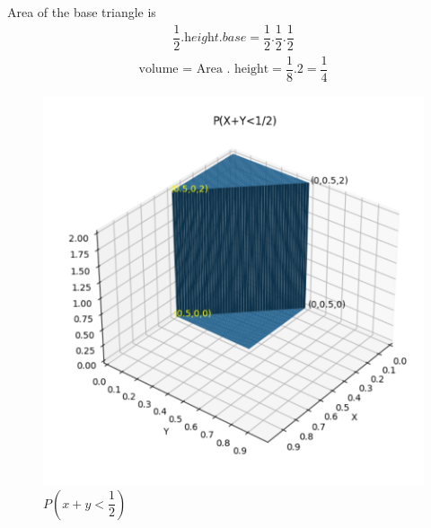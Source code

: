 Area of the base triangle is 
\begin{align}
 \dfrac{1}{2}.\textit{height}.\textit{base} =\dfrac{1}{2}.\dfrac{1}{2}.\dfrac{1}{2}
 \end{align}
 \begin{align}
\text{volume = Area . height}=\dfrac{1}{8}. 2= \dfrac{1}{4}
\end{align}

\begin{figure}[h]
    \centering
    \includegraphics[width=\columnwidth]{solutions/ec/75/P(x+y_2)_graph.png}
    \caption{$P\left(x+y<\dfrac{1}{2}\right)$}
    \label{ec/75/fig:p(x+y<1/2)}
\end{figure}


